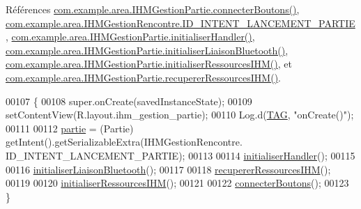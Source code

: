 Références \hyperlink{_i_h_m_gestion_partie_8java_source_l00346}{com.\+example.\+area.\+I\+H\+M\+Gestion\+Partie.\+connecter\+Boutons()}, \hyperlink{_i_h_m_gestion_rencontre_8java_source_l00043}{com.\+example.\+area.\+I\+H\+M\+Gestion\+Rencontre.\+I\+D\+\_\+\+I\+N\+T\+E\+N\+T\+\_\+\+L\+A\+N\+C\+E\+M\+E\+N\+T\+\_\+\+P\+A\+R\+T\+IE}, \hyperlink{_i_h_m_gestion_partie_8java_source_l00291}{com.\+example.\+area.\+I\+H\+M\+Gestion\+Partie.\+initialiser\+Handler()}, \hyperlink{_i_h_m_gestion_partie_8java_source_l00329}{com.\+example.\+area.\+I\+H\+M\+Gestion\+Partie.\+initialiser\+Liaison\+Bluetooth()}, \hyperlink{_i_h_m_gestion_partie_8java_source_l00223}{com.\+example.\+area.\+I\+H\+M\+Gestion\+Partie.\+initialiser\+Ressources\+I\+H\+M()}, et \hyperlink{_i_h_m_gestion_partie_8java_source_l00180}{com.\+example.\+area.\+I\+H\+M\+Gestion\+Partie.\+recuperer\+Ressources\+I\+H\+M()}.


\begin{DoxyCode}
00107     \{
00108         super.onCreate(savedInstanceState);
00109         setContentView(R.layout.ihm\_gestion\_partie);
00110         Log.d(\hyperlink{classcom_1_1example_1_1area_1_1_i_h_m_gestion_partie_a78af1eb84e4a48b7f69c3ebee193933c}{TAG}, \textcolor{stringliteral}{"onCreate()"});
00111 
00112         \hyperlink{classcom_1_1example_1_1area_1_1_i_h_m_gestion_partie_a225e150f813f8fa5c632709a57eacc32}{partie} = (Partie) getIntent().getSerializableExtra(IHMGestionRencontre.
      ID\_INTENT\_LANCEMENT\_PARTIE);
00113 
00114         \hyperlink{classcom_1_1example_1_1area_1_1_i_h_m_gestion_partie_a26db1ff779d6ce415ab481dd79295115}{initialiserHandler}();
00115 
00116         \hyperlink{classcom_1_1example_1_1area_1_1_i_h_m_gestion_partie_a98f583c39004081b004b854085000256}{initialiserLiaisonBluetooth}();
00117 
00118         \hyperlink{classcom_1_1example_1_1area_1_1_i_h_m_gestion_partie_a2161909470bc787c850df7266c44a0c2}{recupererRessourcesIHM}();
00119 
00120         \hyperlink{classcom_1_1example_1_1area_1_1_i_h_m_gestion_partie_a7d67797752c3b0f4e0cab951c8e11e8d}{initialiserRessourcesIHM}();
00121 
00122         \hyperlink{classcom_1_1example_1_1area_1_1_i_h_m_gestion_partie_a6be1ce3804251a75cef8d58514645e2c}{connecterBoutons}();
00123     \}
\end{DoxyCode}
\mbox{\label{classcom_1_1example_1_1area_1_1_i_h_m_gestion_partie_a5706132cc0d20b0c4a67fdc2e9c94a4e}} 
